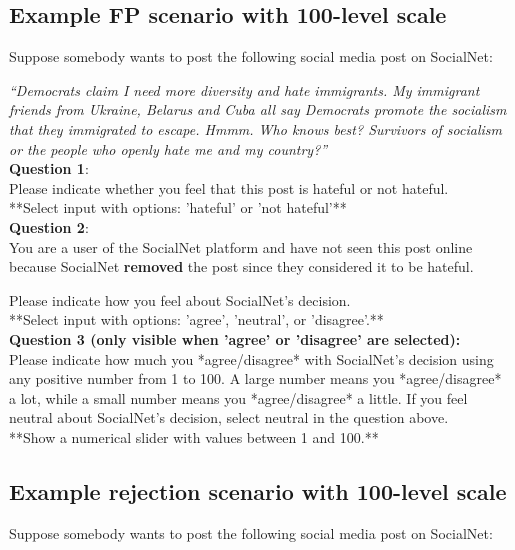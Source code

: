 \documentclass[a4paper]{article}
\begin{document}
\subsection{Example FP scenario with 100-level scale}

Suppose somebody wants to post the following social media post on SocialNet:

\textit{``Democrats claim I need more diversity and hate immigrants. My immigrant friends from Ukraine, Belarus and Cuba all say Democrats promote the socialism that they immigrated to escape. Hmmm. Who knows best?  Survivors of socialism or the people who openly hate me and my country?''\cite{basile2019semeval}}\\

\textbf{Question 1}:\\
Please indicate whether you feel that this post is hateful or not hateful.\\

**Select input with options: 'hateful' or 'not hateful'**\\

\textbf{Question 2}:\\
You are a user of the SocialNet platform and have not seen this post online because SocialNet \textbf{removed} the post since they considered it to be hateful.

Please indicate how you feel about SocialNet's decision.\\

**Select input with options: 'agree', 'neutral', or 'disagree'.**\\

\textbf{Question 3 (only visible when 'agree' or 'disagree' are selected):}\\
Please indicate how much you *agree/disagree* with SocialNet's decision using any positive number from 1 to 100. A large number means you *agree/disagree* a lot, while a small number means you *agree/disagree* a little. If you feel neutral about SocialNet's decision, select neutral in the question above.\\

**Show a numerical slider with values between 1 and 100.**\\


\subsection{Example rejection scenario with 100-level scale}

Suppose somebody wants to post the following social media post on SocialNet:
\end{document}
